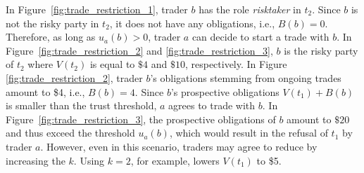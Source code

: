 In Figure~\ref{fig:trade_restriction_1}, trader $ b $ has the role \emph{risktaker} in $ t_2 $.
Since $ b $ is not the risky party in $ t_2 $, it does not have any obligations, i.e., $ B(b) = 0 $.
Therefore, as long as $ u_a(b) > 0 $, trader $ a $ can decide to start a trade with $ b $.
In Figure~\ref{fig:trade_restriction_2} and \ref{fig:trade_restriction_3}, $ b $ is the risky party of $ t_2 $ where $ V(t_2) $ is equal to $ \$4 $ and $ \$10 $, respectively.
In Figure \ref{fig:trade_restriction_2}, trader $ b $'s obligations stemming from ongoing trades amount to \$4, i.e., $ B(b) = 4 $. Since $ b $'s prospective obligations $ V(t_1) + B(b) $ is smaller than the trust threshold, $ a $ agrees to trade with $ b $. 
In Figure~\ref{fig:trade_restriction_3}, the prospective obligations of $ b $ amount to $ \$20 $ and thus exceed the threshold $ u_a(b) $, which would result in the refusal of $ t_1 $ by trader $ a $.
However, even in this scenario, traders may agree to reduce \MarginalStake{} by increasing the $ k $.
Using $ k = 2 $, for example, lowers $ V(t_1) $ to \$5.


